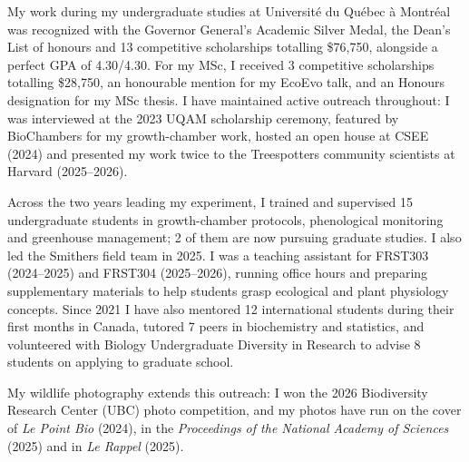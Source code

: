 \documentclass[12pt]{article}
\begin{document}
My work during my undergraduate studies at Université du Québec à Montréal was recognized with the Governor General's Academic Silver Medal, the Dean's List of honours and 13 competitive scholarships totalling \$76,750, alongside a perfect GPA of 4.30/4.30. For my MSc, I received 3 competitive scholarships totalling \$28,750, an honourable mention for my EcoEvo talk, and an Honours designation for my MSc thesis. I have maintained active outreach throughout: I was interviewed at the 2023 UQAM scholarship ceremony, featured by BioChambers for my growth-chamber work, hosted an open house at CSEE (2024) and presented my work twice to the Treespotters community scientists at Harvard (2025--2026).

Across the two years leading my experiment, I trained and supervised 15 undergraduate students in growth-chamber protocols, phenological monitoring and greenhouse management; 2 of them are now pursuing graduate studies. I also led the Smithers field team in 2025. I was a teaching assistant for FRST303 (2024--2025) and FRST304 (2025--2026), running office hours and preparing supplementary materials to help students grasp ecological and plant physiology concepts. Since 2021 I have also mentored 12 international students during their first months in Canada, tutored 7 peers in biochemistry and statistics, and volunteered with Biology Undergraduate Diversity in Research to advise 8 students on applying to graduate school.

My wildlife photography extends this outreach: I won the 2026 Biodiversity Research Center (UBC) photo competition, and my photos have run on the cover of \textit{Le Point Bio} (2024), in the \textit{Proceedings of the National Academy of Sciences} (2025) and in \textit{Le Rappel} (2025).
\end{document}

